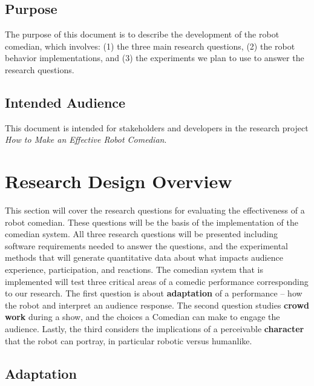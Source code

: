 \documentclass[onecolumn, draftclsnofoot,10pt, compsoc]{IEEEtran}
\begin{document}
  \subsection{Purpose}
	The purpose of this document is to describe the development of the robot comedian, which involves: (1) the three
main research questions, (2) the robot behavior implementations, and (3) the experiments we plan to use to answer the
research questions.

\subsection{Intended Audience}
	This document is intended for stakeholders and developers in the research project \textit{How to Make an Effective Robot Comedian}.


\section{Research Design Overview}
This section will cover the research questions for evaluating the effectiveness of a robot comedian. These questions will
be the basis of the implementation of the comedian system. All three research questions will be presented including
software requirements needed to answer the questions, and the experimental methods that will generate quantitative
data about what impacts audience experience, participation, and reactions.
The comedian system that is implemented will test three critical areas of a comedic performance corresponding
to our research. The first question is about \textbf{adaptation} of a performance – how the robot and interpret an audience
response. The second question studies \textbf{crowd work} during a show, and the choices a Comedian can make to engage the
audience. Lastly, the third considers the implications of a perceivable \textbf{character} that the robot can portray, in particular robotic versus humanlike.


\subsection{Adaptation}
\end{document}
